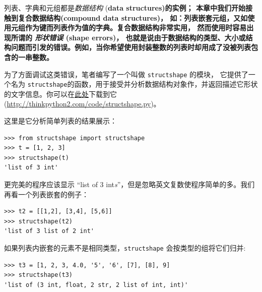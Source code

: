 列表、字典和元组都是{\em 数据结构}  (\bf{data structures})的实例； 本章中我们开始接触到复合数据结构(\bf {compound data structures})， 如：列表嵌套元组，又如使用元组作为键而列表作为值的字典。复合数据结构非常实用， 然而使用时容易出现所谓的 {\em 形状错误} (\bf{shape errors})， 也就是说由于数据结构的类型、大小或结构问题而引发的错误。例如，当你希望使用封装整数的列表时却用成了没被列表包含的一串整数。
 


为了方面调试这类错误，笔者编写了一个叫做 \lstinline{structshape} 的模块， 它提供了一个名为 \lstinline{structshape}的函数，用于接受并分析数据结构对象作，并返回描述它形状的文字信息。你可以在\href{http://thinkpython2.com/code/structshape.py}{此处}下载到它(\url{http://thinkpython2.com/code/structshape.py})。


这里是它分析简单列表的结果展示：

\begin{lstlisting}
>>> from structshape import structshape
>>> t = [1, 2, 3]
>>> structshape(t)
'list of 3 int'
\end{lstlisting}

%

更完美的程序应该显示 ``list of 3 int{\em s}''，但是忽略英文复数使程序简单的多。我们再看一个列表嵌套的例子：

\begin{lstlisting}
>>> t2 = [[1,2], [3,4], [5,6]]
>>> structshape(t2)
'list of 3 list of 2 int'
\end{lstlisting}

%

如果列表内嵌套的元素不是相同类型，\lstinline{structshape} 会按类型的组将它们归并:

\begin{lstlisting}
>>> t3 = [1, 2, 3, 4.0, '5', '6', [7], [8], 9]
>>> structshape(t3)
'list of (3 int, float, 2 str, 2 list of int, int)'
\end{lstlisting}

